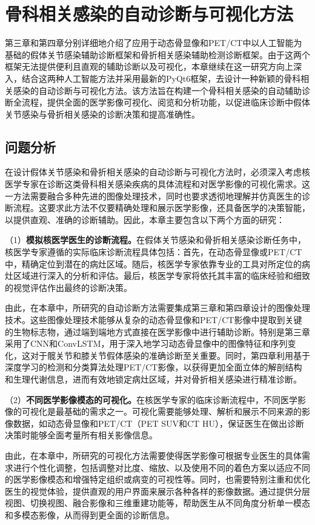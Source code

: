 \chapter{骨科相关感染的自动诊断与可视化方法}

第三章和第四章分别详细地介绍了应用于动态骨显像和PET/CT中以人工智能为基础的假体关节感染辅助诊断框架和骨折相关感染辅助检测诊断框架。由于这两个框架无法提供便利且直观的辅助诊断以及可视化，本章继续在这一研究方向上深入，结合这两种人工智能方法并采用最新的PyQt6框架，去设计一种新颖的骨科相关感染的自动诊断与可视化方法。该方法旨在构建一个骨科相关感染的自动辅助诊断全流程，提供全面的医学影像可视化、阅览和分析功能，以促进临床诊断中假体关节感染与骨折相关感染的诊断决策和提高准确性。

\section{问题分析}

在设计假体关节感染和骨折相关感染的自动诊断与可视化方法时，必须深入考虑核医学专家在诊断这类骨科相关感染疾病的具体流程和对医学影像的可视化需求。这一方法需要融合多种先进的图像处理技术，同时也要求透彻地理解并仿真医生的诊断流程。这要求此方法不仅要精确处理和展示医学影像，还具备医学的决策智能，以提供直观、准确的诊断辅助。因此，本章主要包含以下两个方面的研究：

（1）\textbf{模拟核医学医生的诊断流程。}在假体关节感染和骨折相关感染诊断任务中，核医学专家遵循的实际临床诊断流程具体包括：首先，在动态骨显像或PET/CT中，精确定位到潜在的病灶区域。随后，核医学专家依靠专业的工具对所定位的病灶区域进行深入的分析和评估。最后，核医学专家将依托其丰富的临床经验和细致的视觉评估作出最终的诊断决策。

由此，在本章中，所研究的自动诊断方法需要集成第三章和第四章设计的图像处理技术。这些图像处理技术能够从复杂的动态骨显像和PET/CT影像中提取到关键的生物标志物，通过端到端地方式直接在医学影像中进行辅助诊断。特别是第三章采用了CNN和ConvLSTM，用于深入地学习动态骨显像中的图像特征和序列变化，这对于髋关节和膝关节假体感染的准确诊断至关重要。同时，第四章利用基于深度学习的检测和分类算法处理PET/CT影像，以获得更加全面立体的解剖结构和生理代谢信息，进而有效地锁定病灶区域，并对骨折相关感染进行精准诊断。

（2）\textbf{不同医学影像模态的可视化。}在核医学专家的临床诊断流程中，不同医学影像的可视化是最基础的需求之一。可视化需要能够处理、解析和展示不同来源的影像数据，如动态骨显像和PET/CT（PET SUV和CT HU），保证医生在做出诊断决策时能够全面考量所有相关影像信息。

由此，在本章中，所研究的可视化方法需要使得医学影像可根据专业医生的具体需求进行个性化调整，包括调整对比度、缩放、以及使用不同的着色方案以适应不同的医学影像模态和增强特定组织或病变的可视性等。同时，也需要特别注重和优化医生的视觉体验，提供直观的用户界面来展示各种各样的影像数据。通过提供分层视图、切换视图、融合影像和三维重建功能等，帮助医生从不同角度分析单一模态和多模态影像，从而得到更全面的诊断信息。


